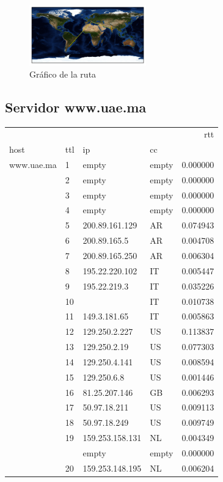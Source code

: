 \begin{figure}[H]
  \centering
    \includegraphics[width=0.45\textwidth]{grafico-rutas/invertisuniversity-ac-in.png}
  \caption{Gráfico de la ruta}
  \label{entropia-s}
\end{figure}




\subsection{Servidor www.uae.ma}

\begin{center}
\begin{tabular}{llllr}
\toprule
           &    &              &    &       rtt \\
host & ttl & ip & cc &           \\
\midrule
www.uae.ma & 1  & empty & empty &  0.000000 \\
           & 2  & empty & empty &  0.000000 \\
           & 3  & empty & empty &  0.000000 \\
           & 4  & empty & empty &  0.000000 \\
           & 5  & 200.89.161.129 & AR &  0.074943 \\
           & 6  & 200.89.165.5 & AR &  0.004708 \\
           & 7  & 200.89.165.250 & AR &  0.006304 \\
           & 8  & 195.22.220.102 & IT &  0.005447 \\
           & 9  & 195.22.219.3 & IT &  0.035226 \\
           & 10 &              & IT &  0.010738 \\
           & 11 & 149.3.181.65 & IT &  0.005863 \\
           & 12 & 129.250.2.227 & US &  0.113837 \\
           & 13 & 129.250.2.19 & US &  0.077303 \\
           & 14 & 129.250.4.141 & US &  0.008594 \\
           & 15 & 129.250.6.8 & US &  0.001446 \\
           & 16 & 81.25.207.146 & GB &  0.006293 \\
           & 17 & 50.97.18.211 & US &  0.009113 \\
           & 18 & 50.97.18.249 & US &  0.009749 \\
           & 19 & 159.253.158.131 & NL &  0.004349 \\
           &    & empty & empty &  0.000000 \\
           & 20 & 159.253.148.195 & NL &  0.006204 \\
\bottomrule
\end{tabular}

\end{center}

